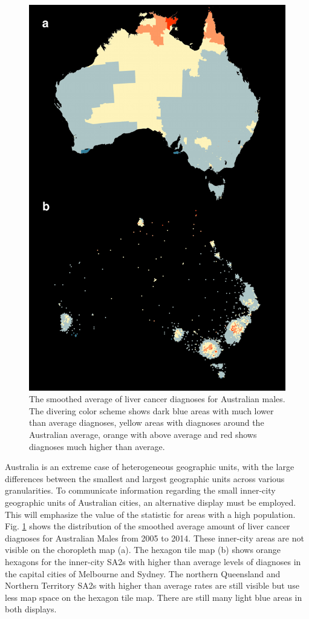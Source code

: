\documentclass[conference,final,]{IEEEtran}
\makeatletter
\def\maxwidth{\ifdim\Gin@nat@width>\linewidth\linewidth
\else\Gin@nat@width\fi}
\let\Oldincludegraphics\includegraphics
\renewcommand{\includegraphics}[1]{\Oldincludegraphics[width=\maxwidth]{#1}}
\makeatother
\begin{document}
\begin{figure}
\centering
\includegraphics{paper_files/figure-latex/liver-1.pdf}
\caption{\label{fig:liver}The smoothed average of liver cancer diagnoses for Australian males. The divering color scheme shows dark blue areas with much lower than average diagnoses, yellow areas with diagnoses around the Australian average, orange with above average and red shows diagnoses much higher than average.}
\end{figure}

Australia is an extreme case of heterogeneous geographic units, with the large differences between the smallest and largest geographic units across various granularities.
To communicate information regarding the small inner-city geographic units of Australian cities, an alternative display must be employed. This will emphasize the value of the statistic for areas with a high population. Fig. \ref{fig:liver} shows the distribution of the smoothed average amount of liver cancer diagnoses for Australian Males from 2005 to 2014.
These inner-city areas are not visible on the choropleth map (a). The hexagon tile map (b) shows orange hexagons for the inner-city SA2s with higher than average levels of diagnoses in the capital cities of Melbourne and Sydney. The northern Queensland and Northern Territory SA2s with higher than average rates are still visible but use less map space on the hexagon tile map. There are still many light blue areas in both displays.
\end{document}
